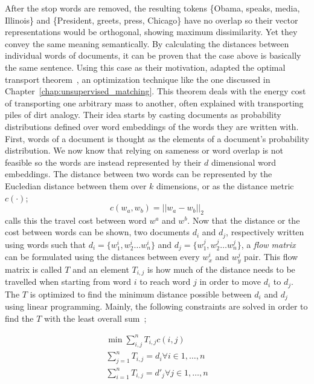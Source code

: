 After the stop words are removed, the resulting tokens \{Obama, speaks, media, Illinois\} and \{President, greets, press, Chicago\} have no overlap so their vector representations would be orthogonal, showing maximum dissimilarity.
Yet they convey the same meaning semantically.
By calculating the distances between individual words of documents, it can be proven that the case above is basically the same sentence.
Using this case as their motivation, \citeauthor{kusnerWord2015} adapted the optimal transport theorem~\cite{kantorovitchtranslocation1958}, an optimization technique like the one discussed in Chapter~\ref{chap:unsupervised_matching}.
This theorem deals with the energy cost of transporting one arbitrary mass to another, often explained with transporting piles of dirt analogy.
Their idea starts by casting documents as probability distributions defined over word embeddings of the words they are written with.
First, words of a document is thought as the elements of a document's probability distribution.
We now know that relying on sameness or word overlap is not feasible so the words are instead represented by their $d$ dimensional word embeddings.
The distance between two words can be represented by the Eucledian distance between them over $k$ dimensions, or as the distance metric $c(\cdot)$;
\begin{displaymath}
    c(w_a, w_b) = || w_a - w_b ||_2
\end{displaymath}
\textcite{kusnerWord2015} calls this the travel cost between word $w^a$ and $w^b$.
Now that the distance or the cost between words can be shown, two documents $d_i$ and $d_j$, respectively written using words such that $d_i = \{w^{i}_1, w^{i}_2 \dots w^{i}_n\}$ and $d_j = \{w^{j}_1, w^{j}_2 \dots w^{j}_n\}$, a \emph{flow matrix} can be formulated using the distances between every $w^{i}_x$ and $w^{j}_y$ pair.
This flow matrix is called $T$ and an element $T_{i,j}$ is how much of the distance needs to be travelled when starting from word $i$ to reach word $j$ in order to move $d_i$ to $d_j$.
The $T$ is optimized to find the minimum distance possible between $d_i$ and $d_j$ using linear programming.
Mainly, the following constraints are solved in order to find the $T$ with the least overall sum~\cite{kusnerWord2015};

\begin{gather}
    \min \sum_{i,j}^{n}T_{i,j}c(i,j) \\
    \sum_{j=1}^{n}T_{i,j} = d_i \forall i \in {1, \dots, n} \\
    \sum_{i=1}^{n}T_{i,j} = d'_j \forall j \in {1, \dots, n}
\end{gather}

